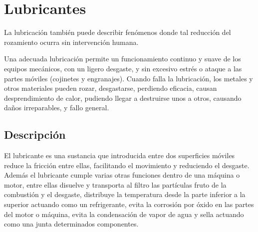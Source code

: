 \documentclass[../main]{subfiles}
\begin{document}
\section{Lubricantes}




La lubricación también puede describir fenómenos donde tal reducción del rozamiento ocurra sin intervención humana.

Una adecuada lubricación permite un funcionamiento continuo y suave de los equipos mecánicos, con un ligero desgaste, y sin excesivo estrés o ataque a las partes móviles (cojinetes y engranajes). Cuando falla la lubricación, los metales y otros materiales pueden rozar, desgastarse, perdiendo eficacia, causan desprendimiento de calor, pudiendo llegar a destruirse unos a otros, causando daños irreparables, y fallo general.



\subsection{Descripción}


El lubricante es una sustancia que introducida entre dos superficies móviles reduce la fricción entre ellas, facilitando el movimiento y reduciendo el desgaste. Además el lubricante cumple varias otras funciones dentro de una máquina o motor, entre ellas disuelve y transporta al filtro las partículas fruto de la combustión y el desgaste, distribuye la temperatura desde la parte inferior a la superior actuando como un refrigerante, evita la corrosión por óxido en las partes del motor o máquina, evita la condensación de vapor de agua y sella actuando como una junta determinados componentes. 
\end{document}
